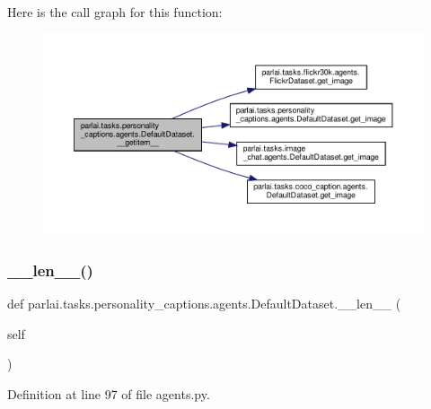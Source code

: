 Here is the call graph for this function\+:
\nopagebreak
\begin{figure}[H]
\begin{center}
\leavevmode
\includegraphics[width=350pt]{classparlai_1_1tasks_1_1personality__captions_1_1agents_1_1DefaultDataset_a76d202d337e31250a02f7decdf886b7a_cgraph}
\end{center}
\end{figure}
\mbox{\label{classparlai_1_1tasks_1_1personality__captions_1_1agents_1_1DefaultDataset_a8388fab891045bf4c2ac38f8b9fca6e5}} 
\subsubsection{\texorpdfstring{\+\_\+\+\_\+len\+\_\+\+\_\+()}{\_\_len\_\_()}}
{\footnotesize\ttfamily def parlai.\+tasks.\+personality\+\_\+captions.\+agents.\+Default\+Dataset.\+\_\+\+\_\+len\+\_\+\+\_\+ (\begin{DoxyParamCaption}\item[{}]{self }\end{DoxyParamCaption})}



Definition at line 97 of file agents.\+py.



